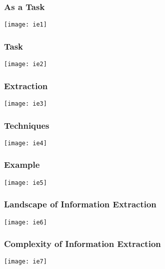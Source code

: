 \begin{frame}[fragile]
  \frametitle{As a Task}
\begin{center}
\texttt{[image: ie1]}
\end{center}
\end{frame}


\begin{frame}[fragile]
  \frametitle{Task}
\begin{center}
\texttt{[image: ie2]}
\end{center}
\end{frame}


\begin{frame}[fragile]
  \frametitle{Extraction}
\begin{center}
\texttt{[image: ie3]}
\end{center}
\end{frame}

\begin{frame}[fragile]
  \frametitle{Techniques}
\begin{center}
\texttt{[image: ie4]}
\end{center}
\end{frame}

\begin{frame}[fragile]
  \frametitle{Example}
\begin{center}
\texttt{[image: ie5]}
\end{center}
\end{frame}

\begin{frame}[fragile]
  \frametitle{Landscape of Information Extraction}
\begin{center}
\texttt{[image: ie6]}
\end{center}
\end{frame}

\begin{frame}[fragile]
  \frametitle{Complexity of Information Extraction}
\begin{center}
\texttt{[image: ie7]}
\end{center}
\end{frame}

